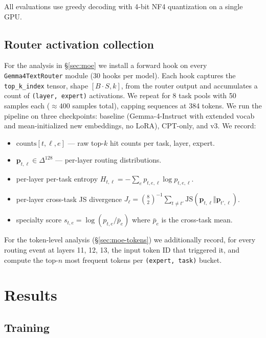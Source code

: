 \documentclass[11pt]{article}
\begin{document}
All evaluations use greedy decoding with 4-bit NF4 quantization on a single GPU.

\subsection{Router activation collection}
\label{sec:hooks}

For the analysis in \S\ref{sec:moe} we install a forward hook on every \texttt{Gemma4TextRouter} module (30 hooks per model). Each hook captures the \texttt{top\_k\_index} tensor, shape $[B \cdot S, k]$, from the router output and accumulates a count of \texttt{(layer, expert)} activations. We repeat for 8 task pools with 50 samples each ($\approx 400$ samples total), capping sequences at 384 tokens. We run the pipeline on three checkpoints: baseline (Gemma-4-Instruct with extended vocab and mean-initialized new embeddings, no LoRA), CPT-only, and v3. We record:
\begin{itemize}\setlength\itemsep{0pt}
\item $\mathrm{counts}[t, \ell, e]$ --- raw top-$k$ hit counts per task, layer, expert.
\item $\mathbf{p}_{t, \ell} \in \Delta^{128}$ --- per-layer routing distributions.
\item per-layer per-task entropy $H_{t,\ell} = -\sum_e p_{t,e,\ell} \log p_{t,e,\ell}$.
\item per-layer cross-task JS divergence $J_\ell = \binom{8}{2}^{-1} \sum_{t \neq t'} \mathrm{JS}(\mathbf{p}_{t,\ell} \Vert \mathbf{p}_{t',\ell})$.
\item specialty score $s_{t,e} = \log(p_{t,e} / \bar p_e)$ where $\bar p_e$ is the cross-task mean.
\end{itemize}

For the token-level analysis (\S\ref{sec:moe-tokens}) we additionally record, for every routing event at layers 11, 12, 13, the input token ID that triggered it, and compute the top-$n$ most frequent tokens per \texttt{(expert, task)} bucket.

\section{Results}
\label{sec:results}

\subsection{Training}
\label{sec:training}
\end{document}
